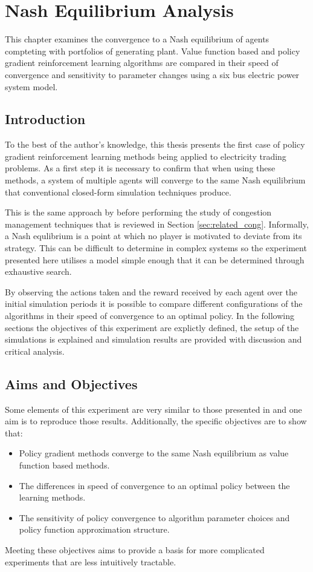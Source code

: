 \chapter{Nash Equilibrium Analysis}
\label{ch:learningtotrade}
This chapter examines the convergence to a Nash equilibrium of agents
compteting with portfolios of generating plant.  Value function based and
policy gradient reinforcement learning algorithms are compared in their speed
of convergence and sensitivity to parameter changes using a six bus electric
power system model.

\section{Introduction}
To the best of the author's knowledge, this thesis presents the first case of
policy gradient reinforcement learning methods being applied to electricity
trading problems.  As a first step it is necessary to confirm that when using
these methods, a system of multiple agents will converge to the same Nash
equilibrium that conventional closed-form simulation techniques produce.

This is the same approach by  before performing the study
of congestion management techniques that is reviewed in Section
\ref{sec:related_cong}.  Informally, a Nash equlibrium is a point at which no
player is motivated to deviate from its strategy.  This can be difficult
to determine in complex systems so the experiment presented here utilises a
model simple enough that it can be determined through exhaustive search.

By observing the actions taken and the reward received by each agent over the
initial simulation periods it is possible to compare different configurations
of the algorithms in their speed of convergence to an optimal policy.  In the
following sections the objectives of this experiment are explictly defined, the
setup of the simulations is explained and simulation results are provided with
discussion and critical analysis.

\section{Aims and Objectives}
Some elements of this experiment are very similar to those presented in
 and one aim is to reproduce those results.  Additionally,
the specific objectives are to show that:
\begin{itemize}
  \item Policy gradient methods converge to the same Nash equilibrium as value
  function based methods.
  \item The differences in speed of convergence to an optimal policy between
  the learning methods.
  \item The sensitivity of policy convergence to algorithm parameter choices
  and policy function approximation structure.
\end{itemize}
Meeting these objectives aims to provide a basis for more complicated
experiments that are less intuitively tractable.

